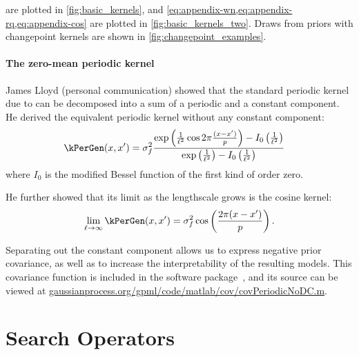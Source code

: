  are plotted in \cref{fig:basic_kernels}, and \cref{eq:appendix-wn,eq:appendix-rq,eq:appendix-cos} are plotted in \cref{fig:basic_kernels_two}.
Draws from \gp{} priors with changepoint kernels are shown in \cref{fig:changepoint_examples}.



\subsubsection{The zero-mean periodic kernel}

James Lloyd (personal communication) showed that the standard periodic kernel due to \citet{mackay1998introduction} can be decomposed into a sum of a periodic and a constant component.
He derived the equivalent periodic kernel without any constant component:
%
\begin{align}
\kPerGen(\inputVar, \inputVar') & =  \sigma_f^2 \frac{\exp\left(\frac{1}{\ell^2}\cos 2 \pi  \frac{(\inputVar - \inputVar')}{p}\right) - I_0\left(\frac{1}{\ell^2}\right)}{\exp\left(\frac{1}{\ell^2}\right) - I_0\left(\frac{1}{\ell^2}\right)} \label{eq:generalized-periodic}
\end{align}
%
where $I_0$ is the modified Bessel function of the first kind of order zero.

He further showed that its limit as the lengthscale grows is the cosine kernel:
%
\begin{equation}
\lim_{\ell \to \infty} \kPerGen(x, x') = \sigma_f^2 \cos\left(\frac{2 \pi (x - x')}{p}\right).
\end{equation}

Separating out the constant component allows us to express negative prior covariance, as well as to increase the interpretability of the resulting models.
This covariance function is included in the \GPML{} software package~\citep{GPML}, and its source can be viewed at \url{gaussianprocess.org/gpml/code/matlab/cov/covPeriodicNoDC.m}.





\chapter{Search Operators}
\label{ch:appendix-search}
\label{sec:search-operators}


